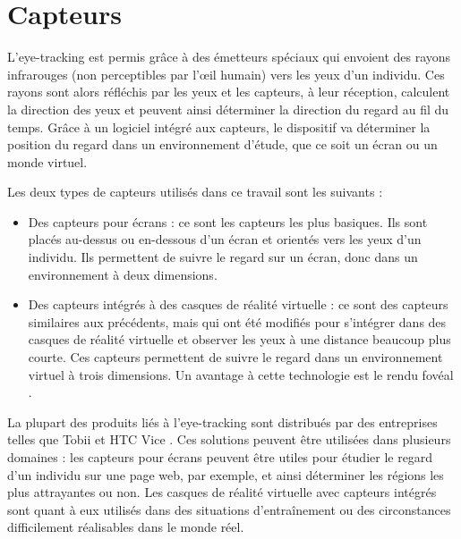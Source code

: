 \documentclass[12pt]{article}
\begin{document}

\section{Capteurs}

L'eye-tracking est permis grâce à des émetteurs spéciaux qui envoient des rayons
infrarouges (non perceptibles par l'œil humain) vers les yeux d'un individu.
Ces rayons sont alors réfléchis par les yeux et les capteurs, à leur réception,
calculent la direction des yeux et peuvent ainsi déterminer la direction du
regard au fil du temps. Grâce à un logiciel intégré aux capteurs, le dispositif
va déterminer la position du regard dans un environnement d'étude, que ce soit
un écran ou un monde virtuel.

\bigskip
Les deux types de capteurs utilisés dans ce travail sont les suivants :
\begin{itemize}
  \item Des capteurs pour écrans : ce sont les capteurs les plus basiques. Ils
        sont placés au-dessus ou en-dessous d'un écran et orientés vers les yeux
        d'un individu. Ils permettent de suivre le regard sur un écran, donc
        dans un environnement à deux dimensions.
  \item Des capteurs intégrés à des casques de réalité virtuelle : ce sont des
        capteurs similaires aux précédents, mais qui ont été modifiés pour
        s'intégrer dans des casques de réalité virtuelle et observer les yeux à
        une distance beaucoup plus courte. Ces capteurs permettent de suivre le
        regard dans un environnement virtuel à trois dimensions. Un avantage à
        cette technologie est le rendu fovéal \cite{wiki:foveated_rendering}.
\end{itemize}

\bigskip
La plupart des produits liés à l'eye-tracking sont distribués par des
entreprises telles que Tobii \cite{tobii} et HTC Vice \cite{htc_vive_pro_eye}.
Ces solutions peuvent être utilisées dans plusieurs domaines \cite{yt:tobii_vr}
: les capteurs pour écrans peuvent être utiles pour étudier le regard d'un
individu sur une page web, par exemple, et ainsi déterminer les régions les
plus attrayantes ou non. Les casques de réalité virtuelle avec capteurs
intégrés sont quant à eux utilisés dans des situations d'entraînement ou des
circonstances difficilement réalisables dans le monde réel.
\end{document}
